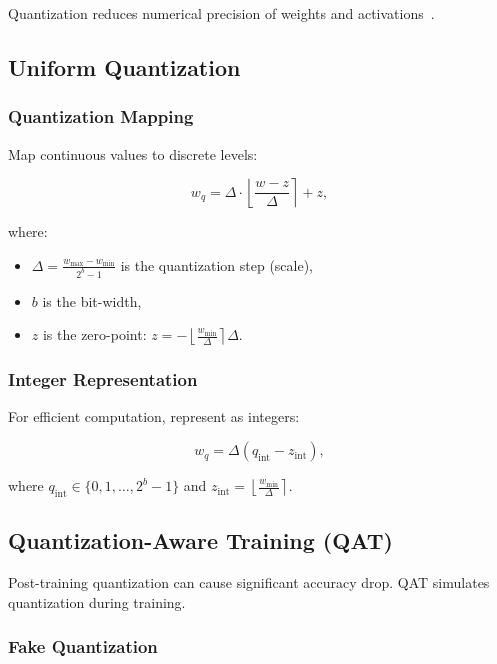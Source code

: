 \documentclass[12pt]{report}
\theoremstyle{definition}
\begin{document}
Quantization reduces numerical precision of weights and activations~\citep{jacob2018quantization}.

\subsection{Uniform Quantization}

\subsubsection{Quantization Mapping}

Map continuous values to discrete levels:

\begin{equation}
w_q = \Delta \cdot \left\lfloor \frac{w - z}{\Delta} \right\rceil + z,
\label{eq:uniform_quant}
\end{equation}

where:
\begin{itemize}
\item $\Delta = \frac{w_{\max} - w_{\min}}{2^b - 1}$ is the quantization step (scale),
\item $b$ is the bit-width,
\item $z$ is the zero-point: $z = -\left\lfloor \frac{w_{\min}}{\Delta} \right\rceil \Delta$.
\end{itemize}

\subsubsection{Integer Representation}

For efficient computation, represent as integers:

\begin{equation}
w_q = \Delta(q_{\text{int}} - z_{\text{int}}),
\label{eq:int_representation}
\end{equation}

where $q_{\text{int}} \in \{0, 1, \ldots, 2^b-1\}$ and $z_{\text{int}} = \left\lfloor \frac{w_{\min}}{\Delta} \right\rceil$.

\subsection{Quantization-Aware Training (QAT)}

Post-training quantization can cause significant accuracy drop. QAT simulates quantization during training.

\subsubsection{Fake Quantization}
\end{document}
